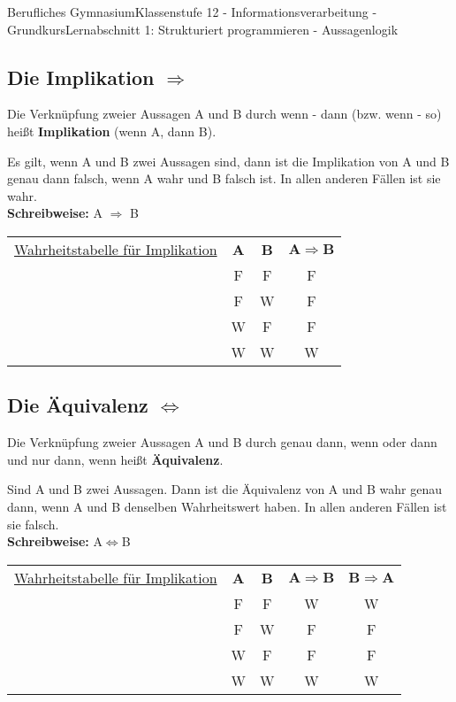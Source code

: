 \documentclass[11pt,oneside,openany,headings=optiontotoc,11pt,numbers=noenddot]{article}
\begin{document}
\begin{worksheet}{Berufliches Gymnasium}{Klassenstufe 12 - Informationsverarbeitung - Grundkurs}{Lernabschnitt 1: Strukturiert programmieren - Aussagenlogik}
		\subsection{Die Implikation \grqq{}$\Rightarrow$\grqq{}}
		Die Verknüpfung zweier Aussagen A und B durch \grqq{}wenn - dann\grqq{} (bzw. \grqq{}wenn - so\grqq{}) heißt \textbf{Implikation} (wenn A, dann B).
		\begin{framed}
			\noindent
			Es gilt, wenn A und B zwei Aussagen sind, dann ist die Implikation von A und B genau dann falsch, wenn A wahr und B falsch ist. In allen anderen Fällen ist sie wahr.\\
			\textbf{Schreibweise:} A $\Rightarrow$ B
		\end{framed}
		\par\noindent
		\begin{tabularx}{\textwidth}{l|c|c|c|}
			\cline{2-4}
			\underline{Wahrheitstabelle für Implikation} & \textbf{A} & \textbf{B} & \(\mathbf{A \Rightarrow{}B}\)\\
			\cline{2-4}
			& F & F & F\\
			\cline{2-4}
			& F & W & F\\
			\cline{2-4}
			& W & F & F\\
			\cline{2-4}
			& W & W & W\\
			\cline{2-4}
		\end{tabularx}
		\subsection{Die Äquivalenz \grqq{}$\Leftrightarrow$\grqq{}}
		Die Verknüpfung zweier Aussagen A und B durch \grqq{}genau dann, wenn\grqq{} oder \grqq{}dann und nur dann, wenn\grqq{} heißt \textbf{Äquivalenz}.
		\begin{framed}
			\noindent
			Sind A und B zwei Aussagen. Dann ist die Äquivalenz von A und B wahr genau dann, wenn A und B denselben Wahrheitswert haben. In allen anderen Fällen ist sie falsch.\\
			\textbf{Schreibweise:} A$\Leftrightarrow$B
		\end{framed}
		\par\noindent
		\begin{tabularx}{\textwidth}{l|c|c|c|c|}
			\cline{2-5}
			\underline{Wahrheitstabelle für Implikation} & \textbf{A} & \textbf{B} & \(\mathbf{A \Rightarrow{}B}\) & \(\mathbf{B \Rightarrow{}A}\)\\
			\cline{2-5}
			& F & F & W & W\\
			\cline{2-5}
			& F & W & F & F\\
			\cline{2-5}
			& W & F & F & F\\
			\cline{2-5}
			& W & W & W & W\\
			\cline{2-5}
		\end{tabularx}

\end{worksheet}
\end{document}
